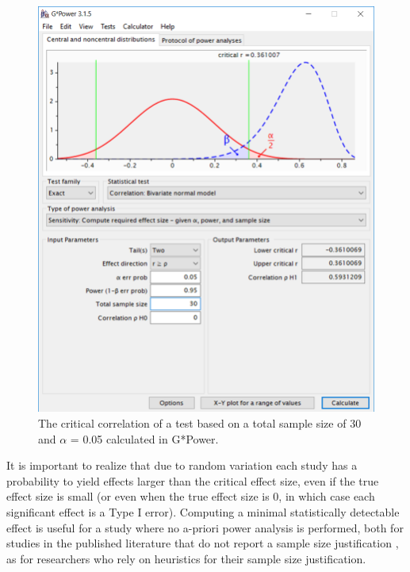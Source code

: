 \documentclass[
  oneside]{book}
\begin{document}
\begin{figure}

{\centering \includegraphics[width=1\linewidth]{images/gpowcrit2} 

}

\caption{The critical correlation of a test based on a total sample size of 30 and $\alpha$ = 0.05 calculated in G*Power.}\label{fig:gcrit2}
\end{figure}

It is important to realize that due to random variation each study has a probability to yield effects larger than the critical effect size, even if the true effect size is small (or even when the true effect size is 0, in which case each significant effect is a Type I error). Computing a minimal statistically detectable effect is useful for a study where no a-priori power analysis is performed, both for studies in the published literature that do not report a sample size justification \citep{lakens_equivalence_2018}, as for researchers who rely on heuristics for their sample size justification.
\end{document}
